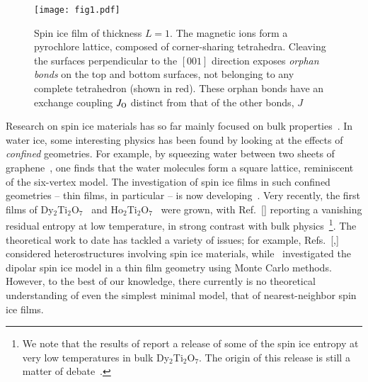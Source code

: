 \documentclass[aps,prx,reprint,runinaddress,superscriptaddress,amsmath,amssymb,floatfix,longbibliography]{revtex4-1}
\newcommand{\Jo}{J_{\rm O}}
\newcommand{\abo}[2]{{#1}$_2${#2}$_2$O$_7$}
\begin{document}
\begin{figure}[htp]
  \centering
  	\texttt{[image: fig1.pdf]}
	\caption{Spin ice film of thickness $L=1$. The magnetic ions form a pyrochlore lattice, composed of corner-sharing tetrahedra. Cleaving the surfaces perpendicular to the $[001]$ direction exposes \emph{orphan bonds} on the top and bottom surfaces, not belonging to any complete tetrahedron (shown in red). These orphan bonds have an exchange coupling $\Jo$ distinct from that of the other bonds, $J$}
	\label{fig:pyrochlore}
\end{figure}

Research on spin ice materials has so far mainly focused on bulk properties~\cite{Gingras2011}. In water ice, some interesting physics has been found by looking at the effects of \emph{confined} geometries. For example, by squeezing water between two sheets of graphene~\cite{algara-siller_square_2015}, one finds that the water molecules form a square lattice, reminiscent of the six-vertex model. The investigation of spin ice films in such confined geometries -- thin films, in particular -- is now developing~\cite{Bovo2014,Petrenko2014,Leusink2014}. Very recently, the first films of Dy$_2$Ti$_2$O$_7$~\cite{Bovo2014} and Ho$_2$Ti$_2$O$_7$~\cite{Leusink2014} were grown, with Ref.~[] reporting a vanishing residual entropy at low temperature, in strong contrast with bulk physics~\footnote{We note that the results of \citet{pomaranski2013absence} report a release of some of the spin ice entropy at very low temperatures in bulk \abo{Dy}{Ti}. The origin of this release is still a matter of debate~\cite{henelius2016,borzi2016intermediate}.}. The theoretical work to date has tackled a variety of issues; for example, Refs.~[,] considered heterostructures involving spin ice materials,  while~\citet{Jaubert2016} investigated the dipolar spin ice model in a thin film geometry using Monte Carlo methods. However, to the best of our knowledge, there currently is no theoretical understanding of even the simplest minimal model, that of nearest-neighbor spin ice films. 
\end{document}
